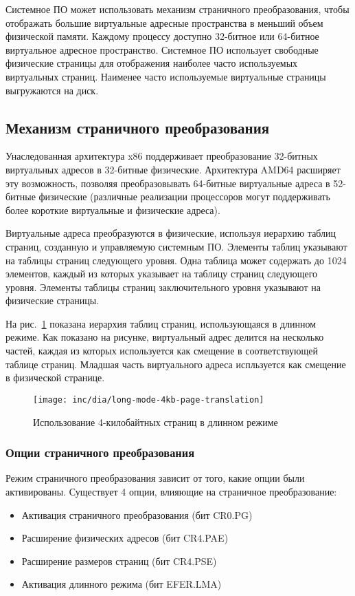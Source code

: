 Системное ПО может использовать механизм страничного преобразования, чтобы отображать большие
виртуальные адресные пространства в меньший объем физической памяти. Каждому процессу доступно
32-битное или 64-битное виртуальное адресное пространство. Системное ПО использует свободные
физические страницы для отображения наиболее часто используемых виртуальных страниц. Наименее часто
используемые виртуальные страницы выгружаются на диск.

\subsection{Механизм страничного преобразования}
Унаследованная архитектура x86 поддерживает преобразование 32-битных виртуальных адресов в 32-битные физические.
Архитектура AMD64 расширяет эту возможность, позволяя преобразовывать 64-битные виртуальные адреса в 52-битные
физические (различные реализации процессоров могут поддерживать более короткие виртуальные и физические адреса).

Виртуальные адреса преобразуются в физические, используя иерархию таблиц страниц, созданную и управляемую системным ПО.
Элементы таблиц указывают на таблицы страниц следующего уровня. Одна таблица может содержать до 1024 элементов,
каждый из которых указывает на таблицу страниц следующего уровня. Элементы таблицы страниц заключительного уровня
указывают на физические страницы.

На рис.~\ref{fig:long-mode-4kb-page-translation} показана иерархия таблиц страниц, использующаяся в длинном режиме.
Как показано на рисунке, виртуальный адрес делится на несколько частей, каждая из которых используется как смещение
в соответствующей таблице страниц. Младшая часть виртуального адреса испльзуется как смещение в физической странице.

\begin{figure}[ht!]
  \centering
  \texttt{[image: inc/dia/long-mode-4kb-page-translation]}
  \caption{Использование 4-килобайтных страниц в длинном режиме}
  \label{fig:long-mode-4kb-page-translation}
\end{figure}

\subsubsection*{Опции страничного преобразования}
Режим страничного преобразования зависит от того, какие опции были активированы. Существует
4 опции, влияющие на страничное преобразование:
\begin{itemize}
	\item Активация страничного преобразования (бит CR0.PG)
	\item Расширение физических адресов (бит CR4.PAE)
	\item Расширение размеров страниц (бит CR4.PSE)
	\item Активация длинного режима (бит EFER.LMA)
\end{itemize}

